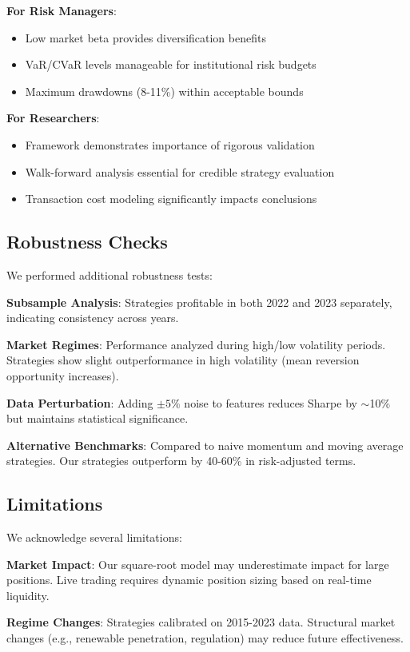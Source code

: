 \documentclass[12pt,a4paper]{article}
\begin{document}
\textbf{For Risk Managers}:
\begin{itemize}
    \item Low market beta provides diversification benefits
    \item VaR/CVaR levels manageable for institutional risk budgets
    \item Maximum drawdowns (8-11\%) within acceptable bounds
\end{itemize}

\textbf{For Researchers}:
\begin{itemize}
    \item Framework demonstrates importance of rigorous validation
    \item Walk-forward analysis essential for credible strategy evaluation
    \item Transaction cost modeling significantly impacts conclusions
\end{itemize}

\subsection{Robustness Checks}

We performed additional robustness tests:

\textbf{Subsample Analysis}: Strategies profitable in both 2022 and 2023 separately, indicating consistency across years.

\textbf{Market Regimes}: Performance analyzed during high/low volatility periods. Strategies show slight outperformance in high volatility (mean reversion opportunity increases).

\textbf{Data Perturbation}: Adding $\pm 5\%$ noise to features reduces Sharpe by $\sim$10\% but maintains statistical significance.

\textbf{Alternative Benchmarks}: Compared to naive momentum and moving average strategies. Our strategies outperform by 40-60\% in risk-adjusted terms.

\subsection{Limitations}

We acknowledge several limitations:

\textbf{Market Impact}: Our square-root model may underestimate impact for large positions. Live trading requires dynamic position sizing based on real-time liquidity.

\textbf{Regime Changes}: Strategies calibrated on 2015-2023 data. Structural market changes (e.g., renewable penetration, regulation) may reduce future effectiveness.
\end{document}
